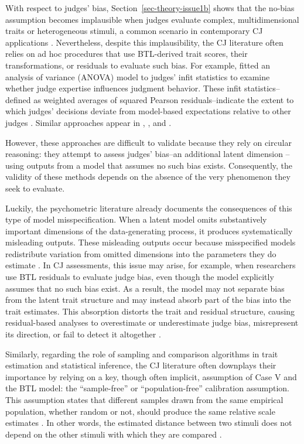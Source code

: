 \documentclass[
  authoryear,
  review,
  1p]{elsarticle}
\begin{document}
With respect to judges' bias, Section~\ref{sec-theory-issue1b} shows
that the no-bias assumption becomes implausible when judges evaluate
complex, multidimensional traits or heterogeneous stimuli, a common
scenario in contemporary CJ applications
\citep[see,][]{vanDaal_et_al_2016, Lesterhuis_et_al_2018, Chambers_et_al_2022}.
Nevertheless, despite this implausibility, the CJ literature often
relies on ad hoc procedures that use BTL-derived trait scores, their
transformations, or residuals to evaluate such bias. For example,
\citet{Wu_2025} fitted an analysis of variance (ANOVA) model to judges'
infit statistics to examine whether judge expertise influences judgment
behavior. These infit statistics--defined as weighted averages of
squared Pearson residuals--indicate the extent to which judges'
decisions deviate from model-based expectations relative to other judges
\citep{Wright_et_al_1982}. Similar approaches appear in
\citet{Pollitt_et_al_2003}, \citet{vanDaal_et_al_2016}, and
\citet{Bartholomew_et_al_2020a}.

However, these approaches are difficult to validate because they rely on
circular reasoning: they attempt to assess judges' bias--an additional
latent dimension \citep{Hoyle_et_al_2023}--using outputs from a model
that assumes no such bias exists. Consequently, the validity of these
methods depends on the absence of the very phenomenon they seek to
evaluate.

Luckily, the psychometric literature already documents the consequences
of this type of model misspecification. When a latent model omits
substantively important dimensions of the data-generating process, it
produces systematically misleading outputs. These misleading outputs
occur because misspecified models redistribute variation from omitted
dimensions into the parameters they do estimate
\citep{Reckase_et_al_1986, Ackerman_1989, Kahraman_2013, Hoyle_et_al_2023}.
In CJ assessments, this issue may arise, for example, when researchers
use BTL residuals to evaluate judge bias, even though the model
explicitly assumes that no such bias exist. As a result, the model may
not separate bias from the latent trait structure and may instead absorb
part of the bias into the trait estimates. This absorption distorts the
trait and residual structure, causing residual-based analyses to
overestimate or underestimate judge bias, misrepresent its direction, or
fail to detect it altogether \citep{Kelly_et_al_2022}.

Similarly, regarding the role of sampling and comparison algorithms in
trait estimation and statistical inference, the CJ literature often
downplays their importance by relying on a key, though often implicit,
assumption of Case V and the BTL model: the ``sample-free'' or
``population-free'' calibration assumption. This assumption states that
different samples drawn from the same empirical population, whether
random or not, should produce the same relative scale estimates
\citep{Wright_1977, Andrich_1978}. In other words, the estimated
distance between two stimuli does not depend on the other stimuli with
which they are compared \citep{Bramley_2008}.
\end{document}
